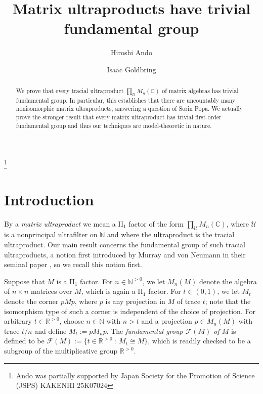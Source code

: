 \documentclass[12pt]{amsart}
\numberwithin{equation}{section}
\theoremstyle{definition}
\newcommand{\N}{\mathbb{N}}
\def\bb{\mathbb}
\def\cal{\mathcal}
\newcommand\cU{{\cal U}}
\def \u{\mathcal U}
\begin{document}

\title{Matrix ultraproducts have trivial fundamental group}

\author{Hiroshi Ando}
\address{Department of Mathematics and Informatics, Chiba University, 1-33 Yayoi-cho, Inage, Chiba
263-8522, Japan}
\thanks{Ando was partially supported by Japan Society for the Promotion of Science (JSPS) KAKENHI 25K07024}
\author{Isaac Goldbring}
\address{Department of Mathematics\\University of California, Irvine, 340 Rowland Hall (Bldg.\# 400),
Irvine, CA 92697-3875}

\begin{abstract}
We prove that every tracial ultraproduct $\prod_\cU M_n(\bb C)$ of matrix algebras has trivial fundamental group.  In particular, this establishes that there are uncountably many nonisomorphic matrix ultraproducts, answering a question of Sorin Popa.  We actually prove the stronger result that every matrix ultraproduct has trivial first-order fundamental group and thus our techniques are model-theoretic in nature.  
\end{abstract}

\maketitle

\section{Introduction}

By a \emph{matrix ultraproduct} we mean a II$_1$ factor of the form $\prod_\cU M_n(\bb C)$, where $\u$ is a nonprincipal ultrafilter on $\bb N$ and where the ultraproduct is the tracial ultraproduct.  Our main result concerns the fundamental group of such tracial ultraproducts, a notion first introduced by Murray and von Neumann in their seminal paper \cite{murray1943rings}, so we recall this notion first.

Suppose that $M$ is a II$_1$ factor.  For $n\in \N^{>0}$, we let $M_n(M)$ denote the algebra of $n\times n$ matrices over $M$, which is again a II$_1$ factor.  For $t\in (0,1)$, we let $M_t$ denote the corner $pMp$, where $p$ is any projection in $M$ of trace $t$; note that the isomorphism type of such a corner is independent of the choice of projection.  For arbitrary $t\in \mathbb{R}^{>0}$, choose $n\in \N$ with $n>t$ and a projection $p\in M_n(M)$ with trace $t/n$ and define $M_t:=pM_np$.  The \emph{fundamental group $\mathcal{F}(M)$ of $M$} is defined to be $\mathcal{F}(M):=\{t\in \bb R^{>0} \ : \ M_t\cong M\}$, which is readily checked to be a subgroup of the multiplicative group $\mathbb{R}^{>0}$.
\end{document}
